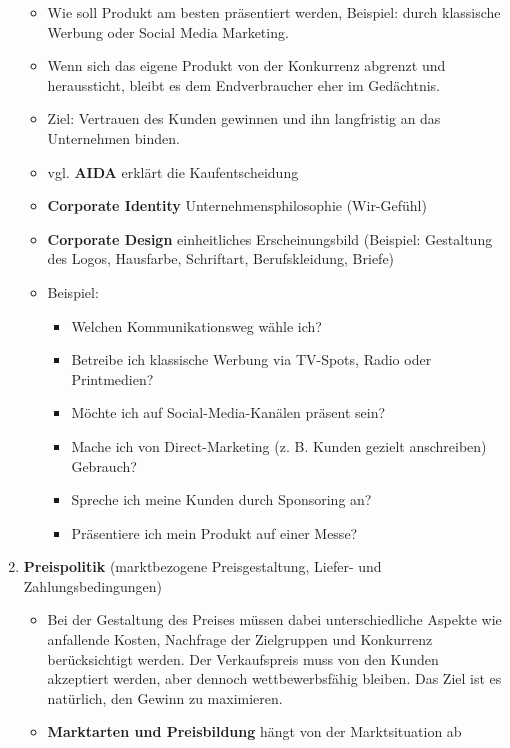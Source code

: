 \begin{enumerate}
  \begin{itemize}
  \item
    Wie soll Produkt am besten präsentiert werden, Beispiel: durch
    klassische Werbung oder Social Media Marketing.
  \item
    Wenn sich das eigene Produkt von der Konkurrenz abgrenzt und
    heraussticht, bleibt es dem Endverbraucher eher im Gedächtnis.
  \item
    Ziel: Vertrauen des Kunden gewinnen und ihn langfristig an das
    Unternehmen binden.
  \item
    vgl. \textbf{AIDA} erklärt die Kaufentscheidung
  \item
    \textbf{Corporate Identity} Unternehmensphilosophie (Wir-Gefühl)
  \item
    \textbf{Corporate Design} einheitliches Erscheinungsbild (Beispiel:
    Gestaltung des Logos, Hausfarbe, Schriftart, Berufskleidung, Briefe)
  \item
    Beispiel:

    \begin{itemize}
    \item
      Welchen Kommunikationsweg wähle ich?
    \item
      Betreibe ich klassische Werbung via TV-Spots, Radio oder
      Printmedien?
    \item
      Möchte ich auf Social-Media-Kanälen präsent sein?
    \item
      Mache ich von Direct-Marketing (z. B. Kunden gezielt anschreiben)
      Gebrauch?
    \item
      Spreche ich meine Kunden durch Sponsoring an?
    \item
      Präsentiere ich mein Produkt auf einer Messe?
    \end{itemize}
  \end{itemize}
\item
  \textbf{Preispolitik} (marktbezogene Preisgestaltung, Liefer- und
  Zahlungsbedingungen)

  \begin{itemize}
  \item
    Bei der Gestaltung des Preises müssen dabei unterschiedliche Aspekte
    wie anfallende Kosten, Nachfrage der Zielgruppen und Konkurrenz
    berücksichtigt werden. Der Verkaufspreis muss von den Kunden
    akzeptiert werden, aber dennoch wettbewerbsfähig bleiben. Das Ziel
    ist es natürlich, den Gewinn zu maximieren.
  \item
    \textbf{Marktarten und Preisbildung} hängt von der Marktsituation ab


\end{itemize}
\end{enumerate}
